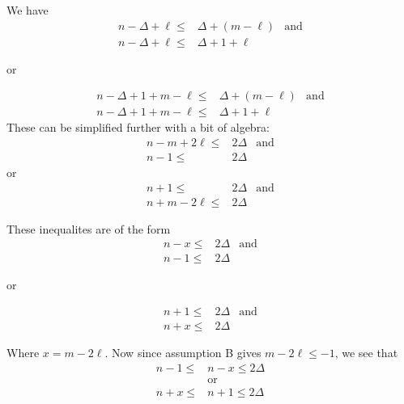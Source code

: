 We have
\begin{align*}
 n - \Delta + \ell \leq & \Delta + (m - \ell) & \text{and} \\
 n - \Delta + \ell \leq & \Delta + 1 + \ell
\end{align*}
\begin{center}or\end{center}
\begin{align*}
 n - \Delta + 1 + m - \ell \leq & \Delta + (m - \ell) & \text{and} \\
 n - \Delta + 1 + m - \ell \leq & \Delta + 1 + \ell
\end{align*}
These can be simplified further with a bit of algebra:
\begin{align*}
 n-m+2\ell \leq & 2 \Delta & \text{and} \\
 n-1 \leq       & 2\Delta
\end{align*}
or
\begin{align*}
 n+1 \leq        & 2 \Delta & \text{and} \\
 n+m-2\ell  \leq & 2 \Delta
\end{align*}

These inequalites are of the form
\begin{align*}
 n-x \leq & 2 \Delta & \text{and} \\
 n-1 \leq & 2\Delta
\end{align*}
\begin{center}or\end{center}
\begin{align*}
 n + 1 \leq & 2 \Delta & \text{and} \\
 n + x \leq & 2 \Delta
\end{align*}

Where $x = m -2\ell$. Now since assumption B gives $m - 2\ell \leq -1$, we
see that
\begin{align*}
 n-1 \leq & n-x \leq 2 \Delta \\
          & \text{or}         \\
 n+x \leq & n+1 \leq 2 \Delta
\end{align*}
